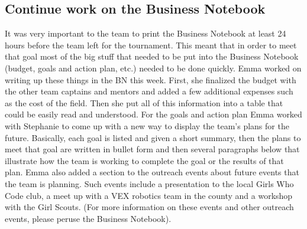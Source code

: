 \documentclass{article}
\newif\ifcontents
\begin{document}
\contentsfalse
\subsection{Continue work on the Business Notebook}
It was very important to the team to print the Business Notebook at least 24 hours before the team left for the tournament. This meant that in order to meet that goal most of the big stuff that needed to be put into the Business Notebook (budget, goals and action plan, etc.) needed to be done quickly. Emma worked on writing up these things in the BN this week. First, she finalized the budget with the other team captains and mentors and added a few additional expenses such as the cost of the field. Then she put all of this information into a table that could be easily read and understood. For the goals and action plan Emma worked with Stephanie to come up with a new way to display the team's plans for the future. Basically, each goal is listed and given a short summary, then the plans to meet that goal are written in bullet form and then several paragraphs below that illustrate how the team is working to complete the goal or the results of that plan. Emma also added a section to the outreach events about future events that the team is planning. Such events include a presentation to the local Girls Who Code club, a meet up with a VEX robotics team in the county and a workshop with the Girl Scouts. (For more information on these events and other outreach events, please peruse the Business Notebook). 
\end{document}
